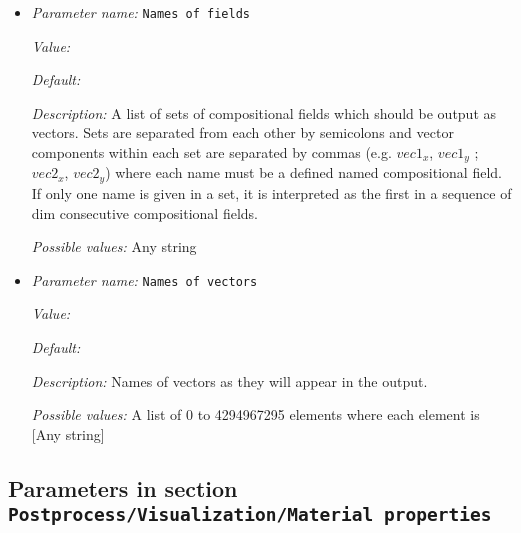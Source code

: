 \begin{itemize}
\item {\it Parameter name:} {\tt Names of fields}
\label{parameters:Postprocess/Visualization/Compositional fields as vectors/Names of fields}


{\it Value:} 


{\it Default:} 


{\it Description:} A list of sets of compositional fields which should be output as vectors. Sets are separated from each other by semicolons and vector components within each set are separated by commas (e.g. $vec1_x$, $vec1_y$ ; $vec2_x$, $vec2_y$) where each name must be a defined named compositional field. If only one name is given in a set, it is interpreted as the first in a sequence of dim consecutive compositional fields.


{\it Possible values:} Any string
\item {\it Parameter name:} {\tt Names of vectors}
\label{parameters:Postprocess/Visualization/Compositional fields as vectors/Names of vectors}


{\it Value:} 


{\it Default:} 


{\it Description:} Names of vectors as they will appear in the output.


{\it Possible values:} A list of 0 to 4294967295 elements where each element is [Any string]
\end{itemize}

\subsection{Parameters in section \tt Postprocess/Visualization/Material properties}
\label{parameters:Postprocess/Visualization/Material_20properties}

